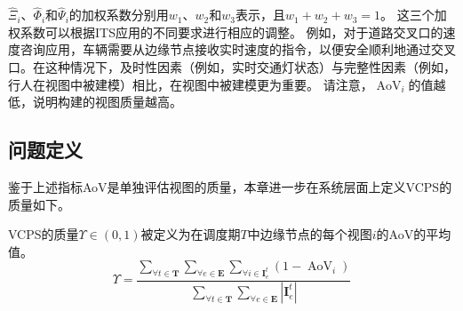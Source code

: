 $\hat{\Xi}_{i}$、$\hat{\Phi}_{i}$和$\hat{\Psi}_{i}$的加权系数分别用$w_1$、$w_2$和$w_3$表示，且$w_1+w_2+w_3=1$。
这三个加权系数可以根据ITS应用的不同要求进行相应的调整。
例如，对于道路交叉口的速度咨询应用，车辆需要从边缘节点接收实时速度的指令，以便安全顺利地通过交叉口。在这种情况下，及时性因素（例如，实时交通灯状态）与完整性因素（例如，行人在视图中被建模）相比，在视图中被建模更为重要。
请注意，$\operatorname{AoV}_{i}$的值越低，说明构建的视图质量越高。

\subsection{问题定义}
鉴于上述指标AoV是单独评估视图的质量，本章进一步在系统层面上定义VCPS的质量如下。
\begin{definition}
VCPS的质量$\Upsilon \in (0,1)$被定义为在调度期$T$中边缘节点的每个视图$i$的AoV的平均值。
\begin{equation}
\Upsilon=\frac{\sum_{\forall t \in \mathbf{T}} \sum_{\forall e \in \mathbf{E}} \sum_{\forall i \in \mathbf{I}_e^t} \left(1 - \operatorname{AoV}_{i}\right)}{\sum_{\forall t \in \mathbf{T}} \sum_{\forall e \in \mathbf{E}} |\mathbf{I}_e^t| }
\end{equation}
\end{definition}

